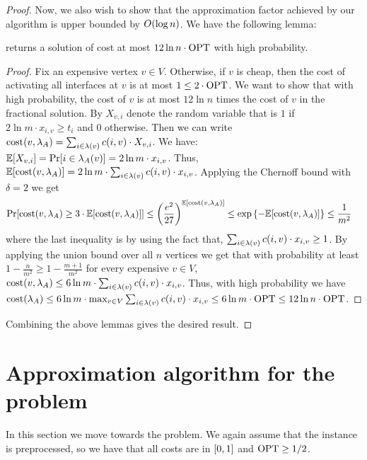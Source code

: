 \begin{proof}
Now, we also wish to show that the approximation factor achieved by our algorithm is upper bounded by $O\mathopen{}\left( \log n \right)$. We have the following lemma:
\begin{lemma}
     returns a solution of cost at most $12\ln n \cdot \textnormal{OPT}$ with high probability.
\end{lemma}
\begin{proof}
Fix an expensive vertex $v\in V$. Otherwise, if $v$ is cheap, then the cost of activating all interfaces at $v$ is at most $1\leq2\cdot\textnormal{OPT}$. We want to show that with high probability, the cost of $v$ is at most $12\ln n$ times the cost of $v$ in the fractional solution. 
By $X_{v, i}$ denote the random variable that is $1$ if $2\ln m\cdot x_{i, v} \geq t_i$ and $0$ otherwise. Then we can write $\textnormal{cost}\mathopen{}\left( v, \lambda_A \right) = \sum_{i\in\lambda\mathopen{}\left( v \right)}c\mathopen{}\left( i, v \right) \cdot X_{v, i}$. We have: $\mathbb{E}\mathopen{}\left[ X_{v, i} \right] = \Pr\mathopen{}\left[ i \in \lambda_A\mathopen{}\left( v \right) \right] = 2\ln m\cdot x_{i, v}$. Thus, $\mathbb{E}\mathopen{}\left[ \textnormal{cost}\mathopen{}\left( v, \lambda_A \right) \right] = 2\ln m \cdot \sum_{i\in\lambda\mathopen{}\left( v \right)}c\mathopen{}\left( i, v \right) \cdot x_{i, v}$. Applying the Chernoff bound with $\delta = 2$ we get 
\begin{align*}
    \Pr\mathopen{}\left[ \textnormal{cost}\mathopen{}\left( v, \lambda_A \right) \geq 3\cdot \mathbb{E}\mathopen{}\left[ \textnormal{cost}\mathopen{}\left( v, \lambda_A \right) \right] \right] & 
    \leq \mathopen{}\left( \frac{e^2}{27} \right)^{\mathbb{E}\mathopen{}\left[ \textnormal{cost}\mathopen{}\left( v, \lambda_A \right) \right]}
    \leq \exp\left\{ -\mathbb{E}\mathopen{}\left[ \textnormal{cost}\mathopen{}\left( v, \lambda_A \right) \right] \right\}\leq \frac{1}{m^2}
\end{align*}
where the last inequality is by using the fact that, $\sum_{i\in\lambda\mathopen{}\left( v \right)}c\mathopen{}\left( i, v \right) \cdot x_{i, v} \geq 1$. By applying the union bound over all $n$ vertices we get that with probability at least $1-\frac{n}{m^2}\geq 1-\frac{m+1}{m^2}$ for every expensive $v\in V$, $\textnormal{cost}\mathopen{}\left( v, \lambda_A \right) \leq 6\ln m \cdot \sum_{i\in\lambda\mathopen{}\left( v \right)}c\mathopen{}\left( i, v \right) \cdot x_{i, v}$. Thus, with high probability we have $\textnormal{cost}\mathopen{}\left( \lambda_A \right) \leq 6\ln m \cdot \max_{v\in V}\sum_{i\in\lambda\mathopen{}\left( v \right)}c\mathopen{}\left( i, v \right) \cdot x_{i, v} \leq 6\ln m \cdot \textnormal{OPT}\leq 12\ln n \cdot \textnormal{OPT}$. 
\end{proof}
Combining the above lemmas gives the desired result.
\end{proof}

\section{Approximation algorithm for the \connectivity problem} \label{sec:connectivity}

In this section we move towards the \connectivity problem. We again assume that the instance is preprocessed, so we have that all costs are in $\mathopen{}\left[ 0,1 \right]$ and $\textnormal{OPT} \geq 1/2$.

